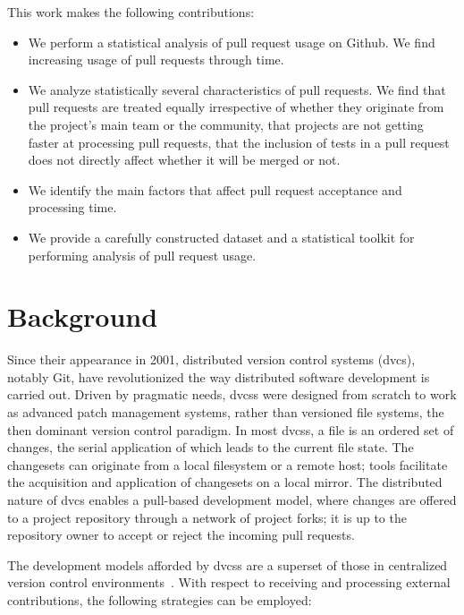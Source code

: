 \documentclass{acm_proc_article-sp}
\begin{document}
This work makes the following contributions:

\begin{itemize}

  \item We perform a statistical analysis of pull request usage on Github.
    We find increasing usage of pull requests through time.

  \item We analyze statistically several characteristics of pull requests.
    We find that pull requests are treated equally irrespective of whether they
    originate from the project's main team or the community, that projects
    are not getting faster at processing pull requests, that the inclusion of
    tests in a pull request does not directly affect whether it will be merged or not.

  \item We identify the main factors that affect pull request acceptance and
    processing time. 

  \item We provide a carefully constructed dataset and a statistical toolkit for
    performing analysis of pull request usage.

\end{itemize}

\section{Background} \label{sec:bg} Since their appearance in 2001, distributed
version control systems ({\sc dvcs}), notably Git, have revolutionized the way
distributed software development is carried out. Driven by pragmatic needs, {\sc
dvcs}s were designed from scratch to work as advanced patch management
systems, rather than versioned file systems, the then dominant version control
paradigm. In most {\sc dvcs}s, a file is an ordered set of changes, the serial
application of which leads to the current file state. The changesets can
originate from a local filesystem or a remote host; tools facilitate the
acquisition and application of changesets on a local mirror. The distributed
nature of {\sc dvcs} enables a pull-based development model, where changes are
offered to a project repository through a network of project forks; it is up to
the repository owner to accept or reject the incoming pull requests.

The development models afforded by {\sc dvcs}s are a superset of 
those in centralized version control environments~\cite{Shiha12,Bird09}. 
With respect to receiving and processing external contributions,
the following strategies can be employed:
\end{document}
